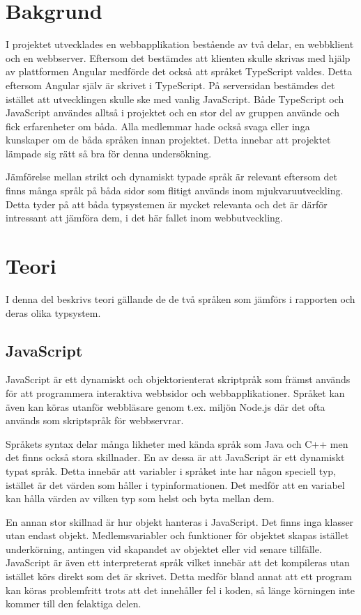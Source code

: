 \section{Bakgrund}
I projektet utvecklades en webbapplikation bestående av två delar, en webbklient och en webbserver. Eftersom det bestämdes att klienten skulle skrivas med hjälp av plattformen Angular medförde det också att språket TypeScript valdes. Detta eftersom Angular själv är skrivet i TypeScript. På serversidan bestämdes det istället att utvecklingen skulle ske med vanlig JavaScript. Både TypeScript och JavaScript användes alltså i projektet och en stor del av gruppen använde och fick erfarenheter om båda. Alla medlemmar hade också svaga eller inga kunskaper om de båda språken innan projektet. Detta innebar att projektet lämpade sig rätt så bra för denna undersökning.

Jämförelse mellan strikt och dynamiskt typade språk är relevant eftersom det finns många språk på båda sidor som flitigt används inom mjukvaruutveckling. Detta tyder på att båda typsystemen är mycket relevanta och det är därför intressant att jämföra dem, i det här fallet inom webbutveckling.
\section{Teori}
I denna del beskrivs teori gällande de de två språken som jämförs i rapporten och deras olika typsystem.
\subsection{JavaScript}
JavaScript är ett dynamiskt och objektorienterat skriptpråk som främst används för att programmera interaktiva webbsidor och webbapplikationer. Språket kan även kan köras utanför webbläsare genom t.ex. miljön Node.js där det ofta används som skriptspråk för webbservrar.\cite{henrik_js1}

Språkets syntax delar många likheter med kända språk som Java och C++ men det finns också stora skillnader. En av dessa är att JavaScript är ett dynamiskt typat språk. Detta innebär att variabler i språket inte har någon speciell typ, istället är det värden som håller i typinformationen. Det medför att en variabel kan hålla värden av vilken typ som helst och byta mellan dem. \cite{henrik_js2}

En annan stor skillnad är hur objekt hanteras i JavaScript. Det finns inga klasser utan endast objekt. Medlemsvariabler och funktioner för objektet skapas istället underkörning, antingen vid skapandet av objektet eller vid senare tillfälle. \cite{henrik_js3}
JavaScript är även ett interpreterat språk \cite{henrik_js1} vilket innebär att det kompileras utan istället körs direkt som det är skrivet. Detta medför bland annat att ett program kan köras problemfritt trots att det innehåller fel i koden, så länge körningen inte kommer till den felaktiga delen.

